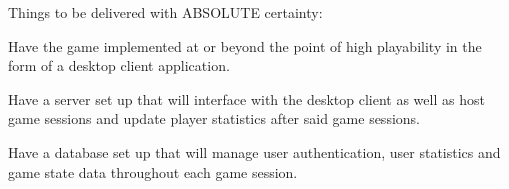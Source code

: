 Things to be delivered with ABSOLUTE certainty:

  \item Have the game implemented at or beyond the point of high playability in the form of a desktop client application.
  \item Have a server set up that will interface with the desktop client as well as host game sessions and update player statistics after said game sessions.
  \item Have a database set up that will manage user authentication, user statistics and game state data throughout each game session.
